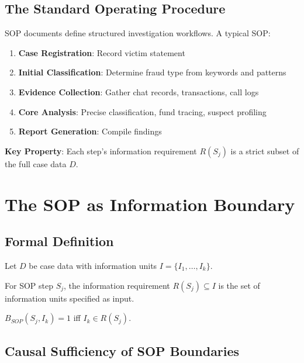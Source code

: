 \documentclass[letterpaper]{article}
\begin{document}
\subsection{The Standard Operating Procedure}

SOP documents define structured investigation workflows. A typical SOP:

\begin{enumerate}
    \item \textbf{Case Registration}: Record victim statement
    \item \textbf{Initial Classification}: Determine fraud type from keywords and patterns
    \item \textbf{Evidence Collection}: Gather chat records, transactions, call logs
    \item \textbf{Core Analysis}: Precise classification, fund tracing, suspect profiling
    \item \textbf{Report Generation}: Compile findings
\end{enumerate}

\textbf{Key Property}: Each step's information requirement $R(S_j)$ is a strict subset of the full case data $D$.

\section{The SOP as Information Boundary}

\subsection{Formal Definition}

Let $D$ be case data with information units $I = \{I_1, \ldots, I_k\}$.

\begin{definition}
For SOP step $S_j$, the information requirement $R(S_j) \subseteq I$ is the set of information units specified as input.
\end{definition}

\begin{definition}
$B_{SOP}(S_j, I_k) = 1$ iff $I_k \in R(S_j)$.
\end{definition}

\subsection{Causal Sufficiency of SOP Boundaries}
\end{document}
